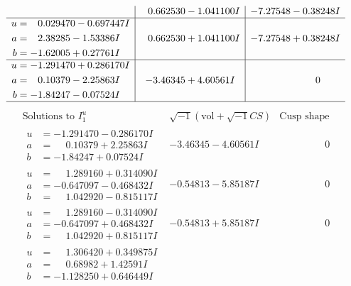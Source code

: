 \documentclass[1p]{elsarticle_modified}
\theoremstyle{definition}
\newcommand{\I}{\sqrt{-1}}
\begin{document}
$$\begin{array}{c|c|c}
 & \phantom{-}0.662530 - 1.041100 I & -7.27548 - 0.38248 I \\ \hline\begin{aligned}
u &= \phantom{-}0.029470 - 0.697447 I \\
a &= \phantom{-}2.38285 - 1.53386 I \\
b &= -1.62005 + 0.27761 I\end{aligned}
 & \phantom{-}0.662530 + 1.041100 I & -7.27548 + 0.38248 I \\ \hline\begin{aligned}
u &= -1.291470 + 0.286170 I \\
a &= \phantom{-}0.10379 - 2.25863 I \\
b &= -1.84247 - 0.07524 I\end{aligned}
 & -3.46345 + 4.60561 I & \phantom{-0.000000 } 0\\
 \hline 
 \end{array}$$\newpage$$\begin{array}{c|c|c}  
\text{Solutions to }I^u_{1}& \I (\text{vol} + \sqrt{-1}CS) & \text{Cusp shape}\\
 \hline 
\begin{aligned}
u &= -1.291470 - 0.286170 I \\
a &= \phantom{-}0.10379 + 2.25863 I \\
b &= -1.84247 + 0.07524 I\end{aligned}
 & -3.46345 - 4.60561 I & \phantom{-0.000000 } 0 \\ \hline\begin{aligned}
u &= \phantom{-}1.289160 + 0.314090 I \\
a &= -0.647097 - 0.468432 I \\
b &= \phantom{-}1.042920 - 0.815117 I\end{aligned}
 & -0.54813 - 5.85187 I & \phantom{-0.000000 } 0 \\ \hline\begin{aligned}
u &= \phantom{-}1.289160 - 0.314090 I \\
a &= -0.647097 + 0.468432 I \\
b &= \phantom{-}1.042920 + 0.815117 I\end{aligned}
 & -0.54813 + 5.85187 I & \phantom{-0.000000 } 0 \\ \hline\begin{aligned}
u &= \phantom{-}1.306420 + 0.349875 I \\
a &= \phantom{-}0.68982 + 1.42591 I \\
b &= -1.128250 + 0.646449 I\end{aligned}

\end{array}$$
\end{document}
